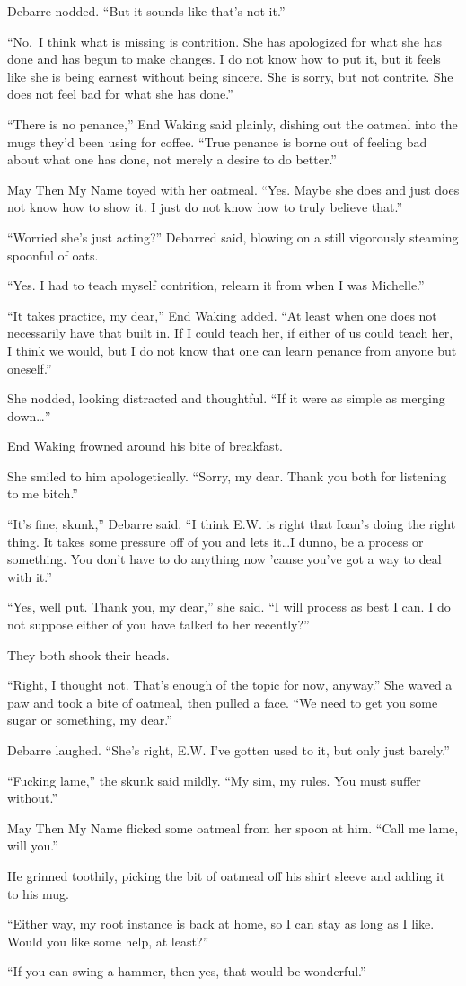 Debarre nodded. ``But it sounds like that's not it.''

``No.~I think what is missing is contrition. She has apologized for what she has done and has begun to make changes. I do not know how to put it, but it feels like she is being earnest without being sincere. She is sorry, but not contrite. She does not feel bad for what she has done.''

``There is no penance,'' End Waking said plainly, dishing out the oatmeal into the mugs they'd been using for coffee. ``True penance is borne out of feeling bad about what one has done, not merely a desire to do better.''

May Then My Name toyed with her oatmeal. ``Yes. Maybe she does and just does not know how to show it. I just do not know how to truly believe that.''

``Worried she's just acting?'' Debarred said, blowing on a still vigorously steaming spoonful of oats.

``Yes. I had to teach myself contrition, relearn it from when I was Michelle.''

``It takes practice, my dear,'' End Waking added. ``At least when one does not necessarily have that built in. If I could teach her, if either of us could teach her, I think we would, but I do not know that one can learn penance from anyone but oneself.''

She nodded, looking distracted and thoughtful. ``If it were as simple as merging down\ldots{}''

End Waking frowned around his bite of breakfast.

She smiled to him apologetically. ``Sorry, my dear. Thank you both for listening to me bitch.''

``It's fine, skunk,'' Debarre said. ``I think E.W. is right that Ioan's doing the right thing. It takes some pressure off of you and lets it\ldots I dunno, be a process or something. You don't have to do anything now 'cause you've got a way to deal with it.''

``Yes, well put. Thank you, my dear,'' she said. ``I will process as best I can. I do not suppose either of you have talked to her recently?''

They both shook their heads.

``Right, I thought not. That's enough of the topic for now, anyway.'' She waved a paw and took a bite of oatmeal, then pulled a face. ``We need to get you some sugar or something, my dear.''

Debarre laughed. ``She's right, E.W. I've gotten used to it, but only just barely.''

``Fucking lame,'' the skunk said mildly. ``My sim, my rules. You must suffer without.''

May Then My Name flicked some oatmeal from her spoon at him. ``Call me lame, will you.''

He grinned toothily, picking the bit of oatmeal off his shirt sleeve and adding it to his mug.

``Either way, my root instance is back at home, so I can stay as long as I like. Would you like some help, at least?''

``If you can swing a hammer, then yes, that would be wonderful.''
